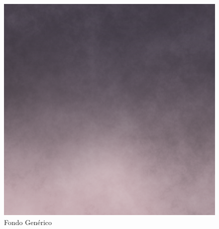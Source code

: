 \begin{figure}[ht]
    \centering
    \begin{minipage}{.45\textwidth}
        \centering
        \includegraphics[width=.9\textwidth]{imgs/fondox.png}
        \caption{Fondo Genérico}
        \label{fig:fondo-generico}
    \end{minipage}
    \begin{minipage}{.5\textwidth}
        \begin{minipage}{.45\textwidth}

\end{minipage}
\end{minipage}
\end{figure}
